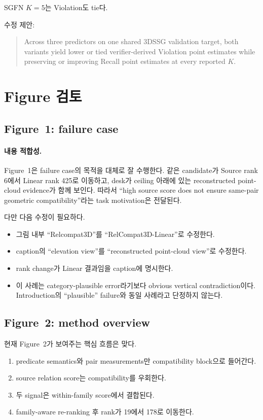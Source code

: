 \documentclass[11pt]{article}
\begin{document}
SGFN $K=5$는 Violation도 tie다.

수정 제안:
\begin{quote}
Across three predictors on one shared 3DSSG validation target, both variants
yield lower or tied verifier-derived Violation point estimates while preserving
or improving Recall point estimates at every reported $K$.
\end{quote}

\section{Figure 검토}

\subsection{Figure~1: failure case}

\paragraph{내용 적합성.}

Figure~1은 failure case의 목적을 대체로 잘 수행한다. 같은 candidate가 Source rank
6에서 Linear rank 425로 이동하고, desk가 ceiling 아래에 있는 reconstructed point-cloud
evidence가 함께 보인다. 따라서 ``high source score does not ensure same-pair geometric
compatibility''라는 task motivation은 전달된다.

다만 다음 수정이 필요하다.

\begin{itemize}[leftmargin=2em]
    \item 그림 내부 ``Relcompat3D''를 ``RelCompat3D-Linear''로 수정한다.
    \item caption의 ``elevation view''를 ``reconstructed point-cloud view''로
    수정한다.
    \item rank change가 Linear 결과임을 caption에 명시한다.
    \item 이 사례는 category-plausible error라기보다 obvious vertical contradiction이다.
    Introduction의 ``plausible'' failure와 동일 사례라고 단정하지 않는다.
\end{itemize}

\subsection{Figure~2: method overview}

현재 Figure~2가 보여주는 핵심 흐름은 맞다.

\begin{enumerate}[leftmargin=2em]
    \item predicate semantics와 pair measurements만 compatibility block으로 들어간다.
    \item source relation score는 compatibility를 우회한다.
    \item 두 signal은 within-family score에서 결합된다.
    \item family-aware re-ranking 후 rank가 19에서 178로 이동한다.
\end{enumerate}
\end{document}
